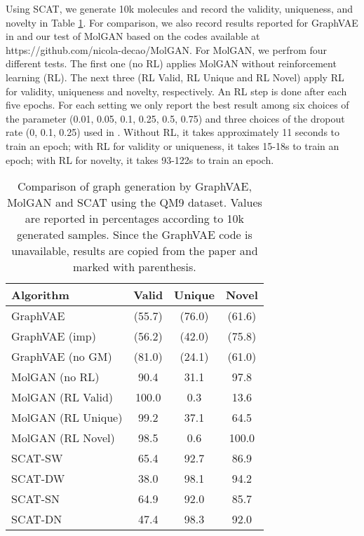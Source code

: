 \documentclass[conference]{IEEEtran}
\begin{document}
Using SCAT, we generate 10k molecules and record the validity, uniqueness, and novelty in Table \ref{tab:molcpr}. For comparison, we also record results reported for GraphVAE in \cite{simonovsky2018graphvae} and our test of MolGAN \cite{de2018molgan} based on the codes available at https://github.com/nicola-decao/MolGAN. For MolGAN, we perfrom four different tests. The first one (no RL) applies MolGAN without reinforcement learning (RL). The next three (RL Valid, RL Unique and RL Novel) apply RL for validity, uniqueness and novelty, respectively. An RL step is done after each five epochs. For each setting we only report the best result among six choices of the parameter  (0.01, 0.05, 0.1, 0.25, 0.5, 0.75) and three choices of the dropout rate (0, 0.1, 0.25) used in \cite{de2018molgan}. Without RL, it takes {approximately 11 seconds} to train an epoch; with RL for validity or uniqueness, it takes 15-18s to train an epoch; with RL for novelty, it takes 93-122s to train an epoch.


\begin{table}[t]
\centering
\caption{Comparison of graph generation by GraphVAE, MolGAN and SCAT using the QM9 dataset. Values are reported in percentages according to 10k generated samples. Since the GraphVAE code is unavailable, results are copied from the paper and marked with parenthesis.}
\begin{tabular}{lccc}
Algorithm & Valid & Unique & Novel \\
\hline
GraphVAE &  (55.7) & (76.0) & (61.6) \\
GraphVAE (imp) & (56.2) & (42.0) & (75.8) \\
GraphVAE (no GM) &  (81.0) & (24.1) & (61.0) \\
\hline
MolGAN (no RL) & 90.4 & 31.1 & 97.8 \\
MolGAN (RL Valid) & 100.0 & 0.3 & 13.6 \\
MolGAN (RL Unique) & 99.2 & 37.1 & 64.5 \\
MolGAN (RL Novel) & 98.5 & 0.6 & 100.0 \\
\hline
{SCAT-SW} & 65.4 & 92.7 & 86.9 \\
{SCAT-DW} & 38.0 & 98.1 & 94.2 \\
{SCAT-SN} & 64.9 & 92.0 & 85.7 \\
{SCAT-DN} & 47.4 & 98.3 & 92.0
\end{tabular}
\label{tab:molcpr}
\end{table}
\end{document}
